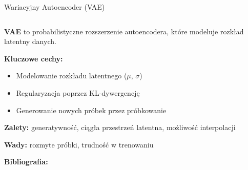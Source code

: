 \documentclass{beamer}
\begin{document}
\begin{frame}{Wariacyjny Autoencoder (VAE)}
  \begin{columns}
    \begin{column}{0.6\textwidth}
    \textbf{VAE} to probabilistyczne rozszerzenie autoencodera, które modeluje rozkład latentny danych.
    
    \medskip
    \textbf{Kluczowe cechy:}
    \begin{itemize}
    \item Modelowanie rozkładu latentnego ($\mu$, $\sigma$)
    \item Regularyzacja poprzez KL-dywergencję
    \item Generowanie nowych próbek przez próbkowanie
    \end{itemize}
    
    \textbf{Zalety:} generatywność, ciągła przestrzeń latentna, możliwość interpolacji
    
    \textbf{Wady:} rozmyte próbki, trudność w trenowaniu
    
    \textbf{Bibliografia:} \cite{kingma2013auto}
    \end{column}
    \begin{column}{0.4\textwidth}
    \centering
    \end{column}
  \end{columns}
\end{frame}
\end{document}
